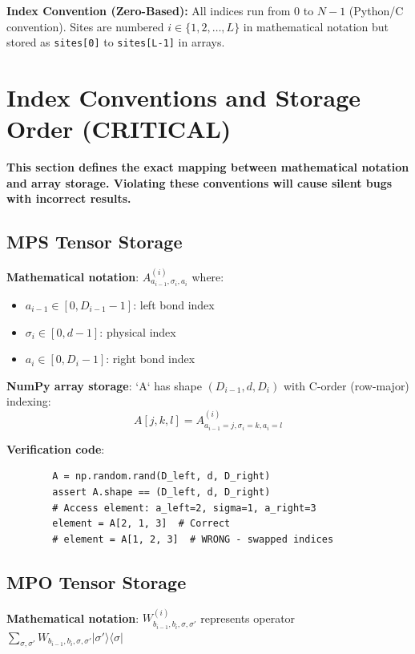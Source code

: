 \documentclass[aps,prb,onecolumn,scriptaddress]{revtex4-2}
\newcommand{\ket}[1]{|#1\rangle}
\newcommand{\bra}[1]{\langle#1|}
\begin{document}
	\textbf{Index Convention (Zero-Based):}
	All indices run from $0$ to $N-1$ (Python/C convention). Sites are numbered $i \in \{1, 2, \ldots, L\}$ in mathematical notation but stored as \texttt{sites[0]} to \texttt{sites[L-1]} in arrays.
	
	\section{Index Conventions and Storage Order (CRITICAL)}
	\label{sec:conventions}
	
	\textbf{This section defines the exact mapping between mathematical notation and array storage. Violating these conventions will cause silent bugs with incorrect results.}
	
	\subsection{MPS Tensor Storage}
	
	\textbf{Mathematical notation}: $A^{(i)}_{a_{i-1},\sigma_i,a_i}$ where:
	\begin{itemize}
		\item $a_{i-1} \in [0, D_{i-1}-1]$: left bond index
		\item $\sigma_i \in [0, d-1]$: physical index
		\item $a_i \in [0, D_i-1]$: right bond index
	\end{itemize}
	
	\textbf{NumPy array storage}: `A` has shape $(D_{i-1}, d, D_i)$ with C-order (row-major) indexing:
	\begin{equation}
		\boxed{A[j, k, l] = A^{(i)}_{a_{i-1}=j, \sigma_i=k, a_i=l}}
	\end{equation}
	
	\textbf{Verification code}:
	\begin{verbatim}
		A = np.random.rand(D_left, d, D_right)
		assert A.shape == (D_left, d, D_right)
		# Access element: a_left=2, sigma=1, a_right=3
		element = A[2, 1, 3]  # Correct
		# element = A[1, 2, 3]  # WRONG - swapped indices
	\end{verbatim}
	
	\subsection{MPO Tensor Storage}
	
	\textbf{Mathematical notation}: $W^{(i)}_{b_{i-1},b_i,\sigma,\sigma'}$ represents operator $\sum_{\sigma,\sigma'} W_{b_{i-1},b_i,\sigma,\sigma'} \ket{\sigma'}\bra{\sigma}$
	
\end{document}
